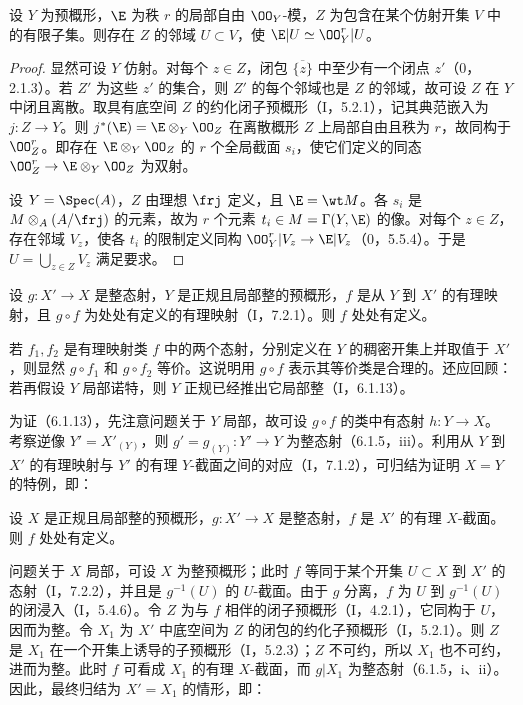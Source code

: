 设 $Y$ 为预概形，$\E$ 为秩 $r$ 的局部自由 $\OO_Y$-模，$Z$ 为包含在某个仿射开集 $V$ 中的有限子集。则存在 $Z$ 的邻域 $U\subset V$，使 $\E|U\simeq\OO_Y^r|U$。
\begin{proof}
显然可设 $Y$ 仿射。对每个 $z\in Z$，闭包 $\overline{\{z\}}$ 中至少有一个闭点 $z'$（0，2.1.3）。若 $Z'$ 为这些 $z'$ 的集合，则 $Z'$ 的每个邻域也是 $Z$ 的邻域，故可设 $Z$ 在 $Y$ 中闭且离散。取具有底空间 $Z$ 的约化闭子预概形（I，5.2.1），记其典范嵌入为 $j:Z\to Y$。则
$j^*(\E)=\E\otimes_Y\OO_Z$ 在离散概形 $Z$ 上局部自由且秩为 $r$，故同构于 $\OO_Z^r$。即存在 $\E\otimes_Y\OO_Z$ 的 $r$ 个全局截面 $s_i$，使它们定义的同态
$\OO_Z^r\to\E\otimes_Y\OO_Z$ 为双射。

设 $Y=\Spec(A)$，$Z$ 由理想 $\frj$ 定义，且 $\E=\wt M$。各 $s_i$ 是 $M\otimes_A(A/\frj)$ 的元素，故为 $r$ 个元素
$t_i\in M=\Gamma(Y,\E)$ 的像。对每个 $z\in Z$，存在邻域 $V_z$，使各 $t_i$ 的限制定义同构
$\OO_Y^r|V_z\to\E|V_z$（0，5.5.4）。于是 $U=\bigcup_{z\in Z}V_z$ 满足要求。
\end{proof}

设 $g:X'\to X$ 是整态射，$Y$ 是正规且局部整的预概形，$f$ 是从 $Y$ 到 $X'$ 的有理映射，且 $g\circ f$ 为处处有定义的有理映射（I，7.2.1）。则 $f$ 处处有定义。

若 $f_1,f_2$ 是有理映射类 $f$ 中的两个态射，分别定义在 $Y$ 的稠密开集上并取值于 $X'$，则显然 $g\circ f_1$ 和 $g\circ f_2$ 等价。这说明用 $g\circ f$ 表示其等价类是合理的。还应回顾：若再假设 $Y$ 局部诺特，则 $Y$ 正规已经推出它局部整（I，6.1.13）。

为证（6.1.13），先注意问题关于 $Y$ 局部，故可设 $g\circ f$ 的类中有态射 $h:Y\to X$。考察逆像 $Y'=X'_{(Y)}$，则
$g'=g_{(Y)}:Y'\to Y$ 为整态射（6.1.5，iii）。利用从 $Y$ 到 $X'$ 的有理映射与 $Y'$ 的有理 $Y$-截面之间的对应（I，7.1.2），可归结为证明 $X=Y$ 的特例，即：

设 $X$ 是正规且局部整的预概形，$g:X'\to X$ 是整态射，$f$ 是 $X'$ 的有理 $X$-截面。则 $f$ 处处有定义。

问题关于 $X$ 局部，可设 $X$ 为整预概形；此时 $f$ 等同于某个开集 $U\subset X$ 到 $X'$ 的态射（I，7.2.2），并且是 $g^{-1}(U)$ 的 $U$-截面。由于 $g$ 分离，$f$ 为 $U$ 到 $g^{-1}(U)$ 的闭浸入（I，5.4.6）。令 $Z$ 为与 $f$ 相伴的闭子预概形（I，4.2.1），它同构于 $U$，因而为整。令 $X_1$ 为 $X'$ 中底空间为 $Z$ 的闭包的约化子预概形（I，5.2.1）。则 $Z$ 是 $X_1$ 在一个开集上诱导的子预概形（I，5.2.3）；$Z$ 不可约，所以 $X_1$ 也不可约，进而为整。此时 $f$ 可看成 $X_1$ 的有理 $X$-截面，而 $g|X_1$ 为整态射（6.1.5，i、ii）。因此，最终归结为 $X'=X_1$ 的情形，即：

